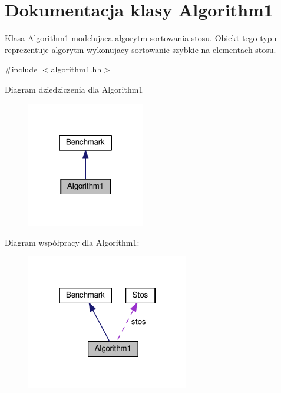 \hypertarget{class_algorithm1}{\section{Dokumentacja klasy Algorithm1}
\label{class_algorithm1}
}


Klasa \hyperlink{class_algorithm1}{Algorithm1} modelujaca algorytm sortowania stosu. Obiekt tego typu reprezentuje algorytm wykonujacy sortowanie szybkie na elementach stosu.  




{\ttfamily \#include $<$algorithm1.\-hh$>$}



Diagram dziedziczenia dla Algorithm1\nopagebreak
\begin{figure}[H]
\begin{center}
\leavevmode
\includegraphics[width=146pt]{class_algorithm1__inherit__graph}
\end{center}
\end{figure}


Diagram współpracy dla Algorithm1\-:\nopagebreak
\begin{figure}[H]
\begin{center}
\leavevmode
\includegraphics[width=201pt]{class_algorithm1__coll__graph}
\end{center}
\end{figure}
